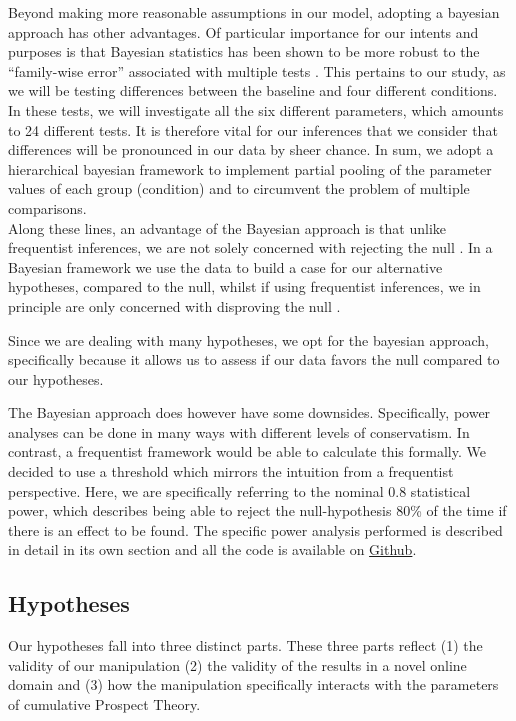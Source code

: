 \documentclass{article}
\begin{document}
    Beyond making more reasonable assumptions in our model, adopting a bayesian approach has other advantages. 
Of particular importance for our intents and purposes is that Bayesian statistics has been shown to be more robust to the “family-wise error” associated with multiple tests \cite{sjolander2019frequentist}. This pertains to our study, as we will be testing differences between the baseline and four different conditions. In these tests, we will investigate all the six different parameters, which amounts to 24 different tests. It is therefore vital for our inferences that we consider that differences will be pronounced in our data by sheer chance. 
In sum, we adopt a hierarchical bayesian framework to implement partial pooling of the parameter values of each group (condition) and to circumvent the problem of multiple comparisons.
\\
Along these lines, an advantage of the Bayesian approach is that unlike frequentist inferences, we are not solely concerned with rejecting the null \cite{sjolander2019frequentist}. In a Bayesian framework we use the data to build a case for our alternative hypotheses, compared to the null, whilst if using frequentist inferences, we in principle are only concerned with disproving the null \cite{sjolander2019frequentist}. 

Since we are dealing with many hypotheses, we opt for the bayesian approach, specifically because it allows us to assess if our data favors the null compared to our hypotheses. 

The Bayesian approach does however have some downsides. Specifically, power analyses can be done in many ways with different levels of conservatism. In contrast, a frequentist framework would be able to calculate this formally. We decided to use a threshold which mirrors the intuition from a frequentist perspective. Here, we are specifically referring to the nominal 0.8 statistical power, which describes being able to reject the null-hypothesis 80\% of the time if there is an effect to be found. The specific power analysis performed is described in detail in its own section and all the code is available on \href{https://github.com/sebsebar/Nature-Study/blob/main/PowerAnalysis/BayesianPower.Rmd}{Github}. 

    \subsection{Hypotheses}
    Our hypotheses fall into three distinct parts. These three parts reflect (1) the validity of our manipulation (2) the validity of the results in a novel online domain and (3) how the manipulation specifically interacts with the parameters of cumulative Prospect Theory.
\end{document}
